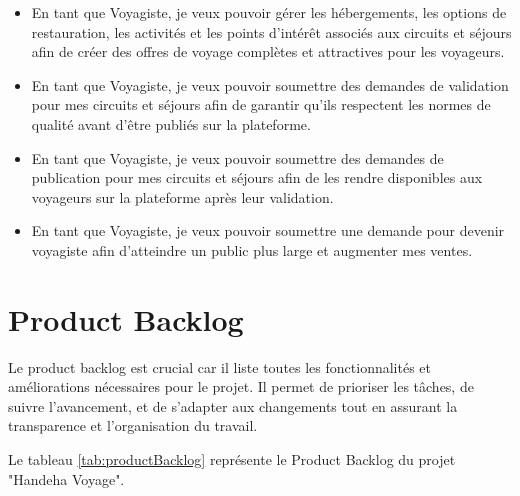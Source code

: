 \documentclass[12pt]{report}
\begin{document}
\begin{itemize}
					\item En tant que Voyagiste, je veux pouvoir gérer les hébergements, les options de restauration, les activités et les points d'intérêt associés aux circuits et séjours afin de créer des offres de voyage complètes et attractives pour les voyageurs.
					\item En tant que Voyagiste, je veux pouvoir soumettre des demandes de validation pour mes circuits et séjours afin de garantir qu'ils respectent les normes de qualité avant d'être publiés sur la plateforme.
					\item En tant que Voyagiste, je veux pouvoir soumettre des demandes de publication pour mes circuits et séjours afin de les rendre disponibles aux voyageurs sur la plateforme après leur validation.
					\item En tant que Voyagiste, je veux pouvoir soumettre une demande pour devenir voyagiste afin d'atteindre un public plus large et augmenter mes ventes.
				\end{itemize}
				
				\section{Product Backlog}

				Le product backlog est crucial car il liste toutes les fonctionnalités et améliorations nécessaires pour le projet. Il permet de prioriser les tâches, de suivre l'avancement, et de s'adapter aux changements tout en assurant la transparence et l'organisation du travail.

				Le tableau \ref{tab:productBacklog} représente le Product Backlog du projet "Handeha Voyage".
\end{document}
